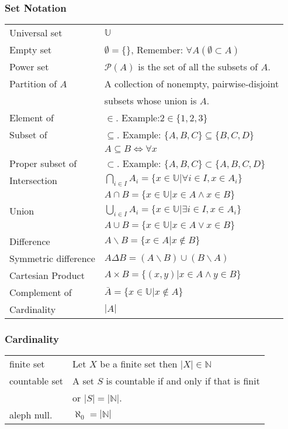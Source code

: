 \documentclass[5pt]{article}
\newcommand{\universalSet}{\mathbb{U}}
\begin{document}
\begin{multicols}{2}
\subsubsection{Set Notation}
\begin{tabular}{ll}
    Universal set           & $\universalSet$\\
    Empty set               & $\emptyset=\{\}$, Remember: $\forall A (\emptyset\subset A)$\\
    Power set               & $\mathcal{P}(A)$ is the set of all the subsets of $A$.\\
    Partition of $A$        & A collection of nonempty, \small{pairwise-disjoint}\\
                            & subsets whose union is $A$.\\
    Element of              & $\in$. Example:$2\in\{1,2,3\}$\\
    Subset of               & $\subseteq$. Example: $\{A, B,C\}\subseteq\{B,C,D\}$\\
                            & $A\subseteq B \Leftrightarrow\forall x$\\
    Proper subset of        & $\subset$. Example: $\{A, B,C\}\subset\{A, B,C,D\}$\\
    Intersection            & $\bigcap_{i\in I}A_i=\{x\in\universalSet|\forall i\in I, x\in A_i\}$\\
                            & $A\cap B=\{x\in\universalSet|x\in A\land x\in B\}$\\
    Union                   & $\bigcup_{i\in I}A_i=\{x\in\universalSet|\exists i\in I, x\in A_i\}$\\
                            & $A\cup B=\{x\in\universalSet|x\in A\lor x\in B\}$\\
    Difference              & $A\backslash B=\{x\in A|x\notin B\}$\\
    Symmetric difference    & $A\Delta B=(A\backslash B)\cup(B\backslash A)$\\
    Cartesian Product       & $A\times B=\{(x,y)|x\in A\land y \in B\}$\\
    Complement of           & $\bar{A}=\{x\in\universalSet|x\notin A\}$\\
    Cardinality             & $|A|$
    
\end{tabular}

\subsubsection{Cardinality}
\begin{tabular}{ll}
    finite set      & Let $X$ be a finite set then $|X|\in \mathbb{N}$\\
    countable set   & A set $S$ is countable if and only if that is finit\\
                    & or $|S|=|\mathbb{N}|$.\\
    aleph null.     & $\aleph_0=|\mathbb{N}|$\\
\end{tabular}


\end{multicols}
\end{document}
